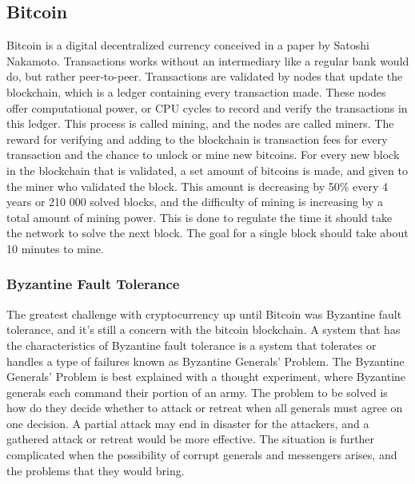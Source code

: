 \documentclass[11pt]{article}
\begin{document}
\subsection{Bitcoin}

Bitcoin is a digital decentralized currency conceived in a paper by Satoshi Nakamoto\cite{nakamoto2009bitcoin}. Transactions works without an intermediary like a regular bank would do, but rather peer-to-peer. Transactions are validated by nodes that update the blockchain, which is a ledger containing every transaction made. These nodes offer computational power, or CPU cycles to record and verify the transactions in this ledger. This process is called mining, and the nodes are called miners. The reward for verifying and adding to the blockchain is transaction fees for every transaction and the chance to unlock or mine new bitcoins. For every new block in the blockchain that is validated, a set amount of bitcoins is made, and given to the miner who validated the block. This amount is decreasing by 50\% every 4 years or 210 000 solved blocks, and the difficulty of mining is increasing by a total amount of mining power. This is done to regulate the time it should take the network to solve the next block. The goal for a single block should take about 10 minutes to mine.

\subsubsection{Byzantine Fault Tolerance}
The greatest challenge with cryptocurrency up until Bitcoin was Byzantine fault tolerance, and it's still a concern with the bitcoin blockchain. A system that has the characteristics of Byzantine fault tolerance is a system that tolerates or handles a type of failures known as Byzantine Generals' Problem\cite{lamport1982byzantine}. The Byzantine Generals' Problem is best explained with a thought experiment, where Byzantine generals each command their portion of an army. The problem to be solved is how do they decide whether to attack or retreat when all generals must agree on one decision. A partial attack may end in disaster for the attackers, and a gathered attack or retreat would be more effective. The situation is further complicated when the possibility of corrupt generals and messengers arises, and the problems that they would bring.
\end{document}
